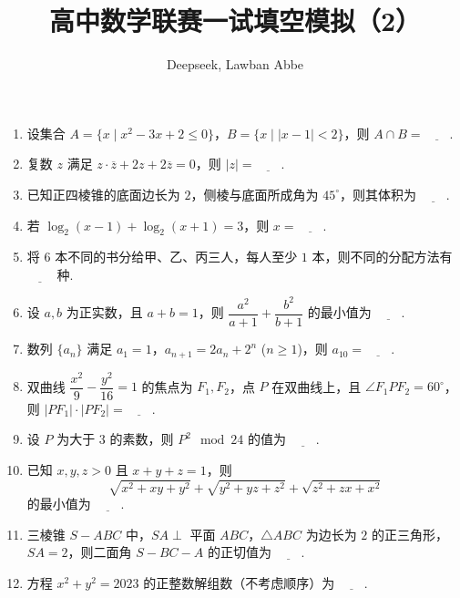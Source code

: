 \documentclass[a4paper,10pt,UTF8]{ctexart}
\title{高中数学联赛一试填空模拟（2）}
\author{Deepseek, Lawban Abbe}
\begin{document}
	
	\maketitle
	\begin{enumerate}
	\item 设集合 $A = \{ x \mid x^2 - 3x + 2 \leq 0 \}$，$B = \{ x \mid |x - 1| < 2 \}$，则 $A \cap B = \underline{\qquad}$.
	
	\item 复数 $z$ 满足 $z \cdot \overline{z} + 2z + 2\overline{z} = 0$，则 $|z| = \underline{\qquad}$.
	
	\item 已知正四棱锥的底面边长为 $2$，侧棱与底面所成角为 $45^\circ$，则其体积为 $\underline{\qquad}$.
	
	\item 若 $\log_2(x-1) + \log_2(x+1) = 3$，则 $x = \underline{\qquad}$.
	
	\item 将 $6$ 本不同的书分给甲、乙、丙三人，每人至少 $1$ 本，则不同的分配方法有 $\underline{\qquad}$ 种.
	
	\item 设 $a, b$ 为正实数，且 $a + b = 1$，则 $\dfrac{a^2}{a+1} + \dfrac{b^2}{b+1}$ 的最小值为 $\underline{\qquad}$.
	
	\item 数列 $\{a_n\}$ 满足 $a_1 = 1$，$a_{n+1} = 2a_n + 2^n$ ($n \geq 1$)，则 $a_{10} = \underline{\qquad}$.
	
	\item 双曲线 $\dfrac{x^2}{9} - \dfrac{y^2}{16} = 1$ 的焦点为 $F_1, F_2$，点 $P$ 在双曲线上，且 $\angle F_1PF_2 = 60^\circ$，则 $|PF_1| \cdot |PF_2| = \underline{\qquad}$.
	
	\item 设 $P$ 为大于 $3$ 的素数，则 $P^2 \mod 24$ 的值为 $\underline{\qquad}$.
	
	\item 已知 $x, y, z > 0$ 且 $x + y + z = 1$，则
	\[
	\sqrt{x^2 + xy + y^2} + \sqrt{y^2 + yz + z^2} + \sqrt{z^2 + zx + x^2}
	\]
	的最小值为 $\underline{\qquad}$.
	
	\item 三棱锥 $S - ABC$ 中，$SA \perp$ 平面 $ABC$，$\triangle ABC$ 为边长为 $2$ 的正三角形，$SA = 2$，则二面角 $S - BC - A$ 的正切值为 $\underline{\qquad}$.
	
	\item 方程 $x^2 + y^2 = 2023$ 的正整数解组数（不考虑顺序）为 $\underline{\qquad}$.
	
	\end{enumerate}
\end{document}
